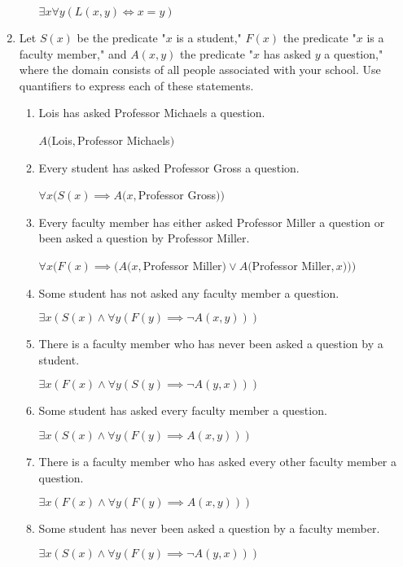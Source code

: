 \documentclass[11pt]{article}
\begin{document}
\begin{enumerate}[label=\textbf{\arabic*.}]
\begin{enumerate}[label=\textbf{\alph*)}]
		$\exists x\forall y(L(x, y) \iff x = y)$
	\end{enumerate}

	\item Let $S(x)$ be the predicate "$x$ is a student," $F(x)$ the predicate "$x$ is a faculty member," and $A(x, y)$ the predicate "$x$ has asked $y$ a question," where the domain consists of all people associated with your school. Use quantifiers to express each of these statements.
	\begin{enumerate}[label=\textbf{\alph*)}]
		\item Lois has asked Professor Michaels a question.
		
		$A($Lois$,$Professor Michaels$)$
		
		\item Every student has asked Professor Gross a question.
		
		$\forall x(S(x) \implies A(x, $Professor Gross$))$
		
		\item Every faculty member has either asked Professor Miller a question or been asked a question by Professor Miller.
		
		$\forall x(F(x) \implies (A(x,$Professor Miller$) \lor A($Professor Miller$, x)))$
		
		\item Some student has not asked any faculty member a question.
		
		$\exists x(S(x) \land \forall y(F(y) \implies \neg A(x, y)))$
		
		\item There is a faculty member who has never been asked a question by a student.
		
		$\exists x(F(x) \land \forall y(S(y) \implies \neg A(y, x)))$
		
		\item Some student has asked every faculty member a question.
		
		$\exists x(S(x) \land \forall y(F(y) \implies A(x, y)))$
		
		\item There is a faculty member who has asked every other faculty member a question.
		
		$\exists x(F(x) \land \forall y(F(y) \implies A(x, y)))$
		
		\item Some student has never been asked a question by a faculty member.
		
		$\exists x(S(x) \land \forall y(F(y) \implies \neg A(y, x)))$
	\end{enumerate}


\end{enumerate}
\end{document}
